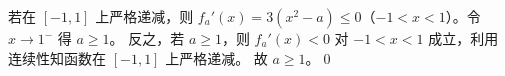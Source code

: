 若在 $[-1,1]$ 上严格递减，则 $f_a'(x)=3(x^2-a)\le0$（$-1<x<1$）。令 $x\to1^-$ 得 $a\ge1$。
反之，若 $a\ge1$，则 $f_a'(x)<0$ 对 $-1<x<1$ 成立，利用连续性知函数在 $[-1,1]$ 上严格递减。
故 $\boxed{a\ge1}$。\qed
